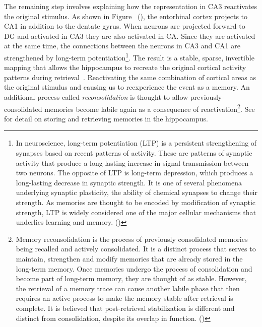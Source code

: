 The remaining step involves explaining how the representation in CA3 reactivates the original stimulus. As shown in Figure~{} ({}), the entorhinal cortex projects to CA1 in addition to the dentate gyrus. When neurons are projected forward to DG and activated in CA3 they are also activated in CA. Since they are activated at the same time, the connections between the neurons in CA3 and CA1 are strengthened by long-term potentiation\footnote{%
%
  In neuroscience, long-term potentiation (LTP) is a persistent strengthening of synapses based on recent patterns of activity. These are patterns of synaptic activity that produce a long-lasting increase in signal transmission between two neurons. The opposite of LTP is long-term depression, which produces a long-lasting decrease in synaptic strength. It is one of several phenomena underlying synaptic plasticity, the ability of chemical synapses to change their strength. As memories are thought to be encoded by modification of synaptic strength, LTP is widely considered one of the major cellular mechanisms that underlies learning and memory. ({})}.
%
The result is a stable, sparse, invertible mapping that allows the hippocampus to recreate the original cortical activity patterns during retrieval~\cite{OReillyetalCS-15,McClellandandGoddardHIPPOCAMPUS-97}. Reactivating the same combination of cortical areas as the original stimulus and causing us to reexperience the event as a memory. An additional process called {\it{reconsolidation}} is thought to allow previously-consolidated memories become labile again as a consequence of reactivation\footnote{%
%
  Memory reconsolidation is the process of previously consolidated memories being recalled and actively consolidated. It is a distinct process that serves to maintain, strengthen and modify memories that are already stored in the long-term memory. Once memories undergo the process of consolidation and become part of long-term memory, they are thought of as stable. However, the retrieval of a memory trace can cause another labile phase that then requires an active process to make the memory stable after retrieval is complete. It is believed that post-retrieval stabilization is different and distinct from consolidation, despite its overlap in function. ({})}.
%
See {} for detail on storing and retrieving memories in the hippocampus.

   

